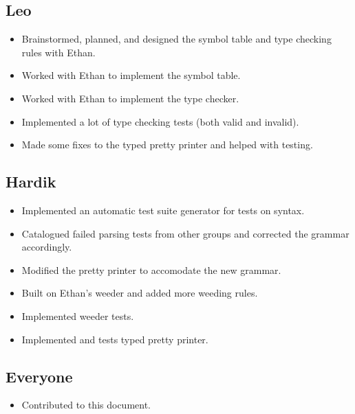 \documentclass{article}
\begin{document}
\subsection*{Leo}

\begin{itemize}
    \item Brainstormed, planned, and designed the symbol table and type checking rules with Ethan.
    \item Worked with Ethan to implement the symbol table.
    \item Worked with Ethan to implement the type checker.
    \item Implemented a lot of type checking tests (both valid and invalid).
    \item Made some fixes to the typed pretty printer and helped with testing.
\end{itemize}

\subsection*{Hardik}

\begin{itemize}
    \item Implemented an automatic test suite generator for tests on syntax.
    \item Catalogued failed parsing tests from other groups and corrected the grammar accordingly.
    \item Modified the pretty printer to accomodate the new grammar.
    \item Built on Ethan's weeder and added more weeding rules.
    \item Implemented weeder tests.
    \item Implemented and tests typed pretty printer.
\end{itemize}

\subsection*{Everyone}

\begin{itemize}
    \item Contributed to this document.
\end{itemize}
\end{document}
